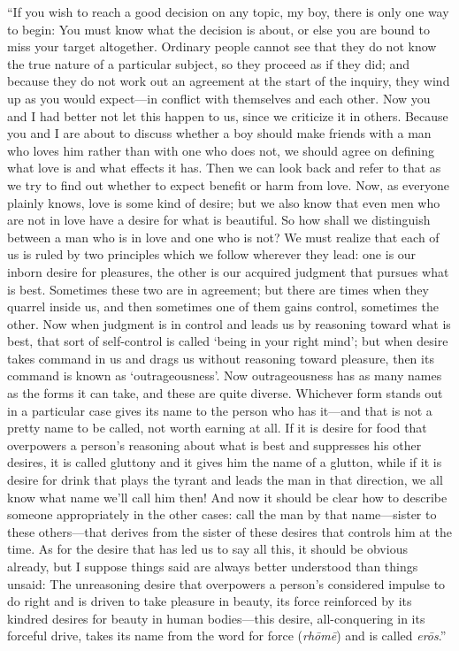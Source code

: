 “If you wish to reach a good decision on any topic, my boy, there is 
only one way to begin: You must know what the decision is about,
or else you are bound to miss your target altogether. Ordinary people
cannot see that they do not know the true nature of a particular
subject, so they proceed as if they did; and because they do not work
out an agreement at the start of the inquiry, they wind up as you would
expect---in conflict with themselves and each other. Now you and I had
better not let this happen to us, since we criticize it in others.
Because you and I are about to discuss whether a boy should make friends
with a man who loves him rather than with one who does not, we
should agree on defining what love is and what effects it has. Then we
can look back and refer to that as we try to find out whether to expect
benefit or harm from love. Now, as everyone plainly knows, love is some
kind of desire; but we also know that even men who are not in love have
a desire for what is beautiful. So how shall we distinguish between a
man who is in love and one who is not? We must realize that each of us
is ruled by two principles which we follow wherever they lead: one is
our inborn desire for pleasures, the other is our acquired judgment that
pursues what is best. Sometimes these two are in agreement; but
there are times when they quarrel inside us, and then sometimes one of
them gains control, sometimes the other. Now when judgment is in control
and leads us by reasoning toward what is best, that sort of self-control
is called ‘being in your right mind'; but when desire 
takes command in us and drags us without reasoning toward pleasure, then
its command is known as
‘outrageousness'. 
Now outrageousness has as many names as the forms it can take, and these are
quite diverse.
Whichever form stands out in a particular case gives its name to the
person who has it---and that is not a pretty name to be called, not
worth earning at all. If it is desire for food that overpowers a
person's reasoning about what is best and suppresses his other desires,
it is called gluttony and it gives him the name of a glutton,
while if it is desire for drink that plays the tyrant and leads the man
in that direction, we all know what name we'll call him then! And now it
should be clear how to describe someone appropriately in the other
cases: call the man by that name---sister to these others---that derives
from the sister of these desires that controls him at the time. As for
the desire that has led us to say all this, it should be obvious
already, but I suppose things said are always better understood than
things unsaid: The unreasoning desire that overpowers a person's
considered impulse to do right and is driven to take pleasure in beauty, 
its force reinforced by its kindred desires for beauty in human
bodies---this desire, all-conquering in its forceful drive, takes its
name from the word for force ({\em rhōmē}) and is called {\em erōs}.”

